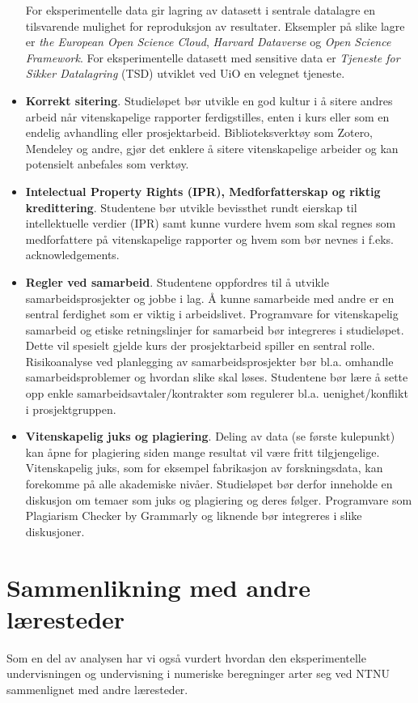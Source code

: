 \documentclass{article}
\begin{document}
\begin{itemize}
    For eksperimentelle data gir lagring av datasett i sentrale datalagre en tilsvarende mulighet for reproduksjon av resultater. Eksempler på slike lagre er \emph{the European Open Science Cloud}, \emph{Harvard Dataverse} og \emph{Open Science Framework}. For eksperimentelle datasett med sensitive data er \emph{Tjeneste for Sikker Datalagring} (TSD) utviklet ved UiO en velegnet tjeneste.
  \item \textbf{Korrekt sitering}. Studieløpet bør utvikle en god kultur i å sitere andres arbeid når vitenskapelige rapporter ferdigstilles, enten i kurs eller som en endelig avhandling eller prosjektarbeid. Biblioteksverktøy som Zotero, Mendeley og andre, gjør det enklere å sitere vitenskapelige arbeider og kan potensielt anbefales som verktøy.
  \item \textbf{Intelectual Property Rights (IPR), Medforfatterskap og riktig kredittering}. Studentene bør utvikle bevissthet rundt eierskap til intellektuelle verdier (IPR) samt kunne vurdere hvem som skal regnes som medforfattere på vitenskapelige rapporter og hvem som bør nevnes i f.eks. acknowledgements.
  \item \textbf{Regler ved samarbeid}. Studentene oppfordres til å utvikle samarbeidsprosjekter og jobbe i lag. Å kunne samarbeide med andre er en sentral ferdighet som er viktig i arbeidslivet. Programvare for vitenskapelig samarbeid og etiske retningslinjer for samarbeid bør integreres i studieløpet. Dette vil spesielt gjelde kurs der prosjektarbeid spiller en sentral rolle.
  Risikoanalyse ved planlegging av samarbeidsprosjekter bør bl.a. omhandle samarbeidsproblemer og hvordan slike skal løses. Studentene bør lære å sette opp enkle samarbeidsavtaler/kontrakter som regulerer bl.a. uenighet/konflikt i prosjektgruppen.
  \item \textbf{Vitenskapelig juks og plagiering}. Deling av data (se første kulepunkt) kan åpne for plagiering siden mange resultat vil være fritt tilgjengelige. Vitenskapelig juks, som for eksempel fabrikasjon av forskningsdata, kan forekomme på alle akademiske nivåer. Studieløpet bør derfor inneholde en diskusjon om temaer som juks og plagiering og deres følger. Programvare som Plagiarism Checker by Grammarly og liknende bør integreres i slike diskusjoner.
\end{itemize}

\section{Sammenlikning med andre læresteder}
Som en del av analysen har vi også vurdert hvordan den eksperimentelle undervisningen og undervisning i numeriske beregninger arter seg ved NTNU sammenlignet med andre læresteder.
\end{document}
